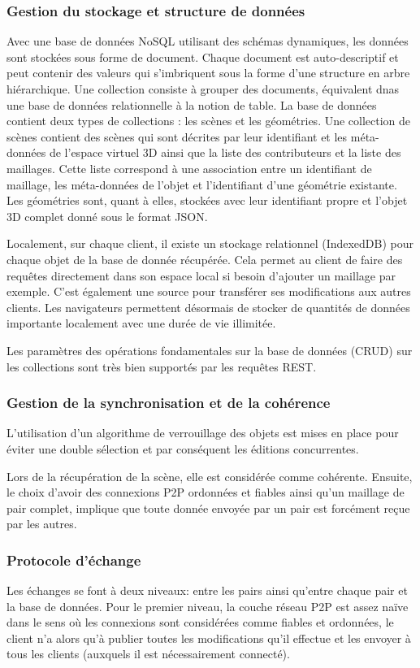 \subsubsection{Gestion du stockage et structure de données}

Avec une base de données NoSQL utilisant des schémas dynamiques, les 
données sont stockées sous forme de document. Chaque document est 
auto-descriptif et peut contenir des valeurs qui s'imbriquent sous la forme d'une 
structure en arbre hiérarchique. Une collection consiste à grouper des documents, 
équivalent dnas une base de données relationnelle à la notion de table. La base de 
données contient deux types de collections : les scènes et les géométries. Une 
collection de scènes contient des scènes qui sont décrites par leur identifiant et 
les méta-données de l'espace virtuel 3D ainsi que la liste des contributeurs et la 
liste des maillages. Cette liste correspond à une association entre un identifiant de 
maillage, les méta-données de l'objet et l'identifiant d'une géométrie existante. 
Les géométries sont, quant à elles, stockées avec leur identifiant propre et l'objet 
3D complet donné sous le format \gls{JSON}.

Localement, sur chaque client, il existe un stockage relationnel (IndexedDB) pour 
chaque objet 
de la base de donnée récupérée. Cela permet au client de faire des requêtes 
directement dans son espace local si besoin d'ajouter un maillage par exemple. 
C'est également une source pour transférer ses modifications aux autres clients.
Les navigateurs permettent désormais de stocker de quantités de données 
importante localement avec une durée de vie illimitée. 

Les paramètres des opérations fondamentales sur la base de données 
(\gls{CRUD}) sur les collections sont très bien supportés par les requêtes 
\gls{REST}.
\subsubsection{Gestion de la synchronisation et de la cohérence}
L'utilisation d'un algorithme de verrouillage des objets est mises en place pour 
éviter une double sélection et par conséquent les éditions concurrentes. 

Lors de la récupération de la scène, elle est considérée comme cohérente. 
Ensuite, le choix d'avoir des connexions \gls{P2P} ordonnées et fiables ainsi qu'un 
maillage de pair complet, implique que toute donnée envoyée par un pair est 
forcément reçue par les autres. 
\subsubsection{Protocole d'échange}
Les échanges se font à deux niveaux: entre les pairs ainsi qu'entre chaque pair et 
la base de données. Pour le premier niveau, la couche réseau \gls{P2P} est assez 
naïve dans le sens où les connexions sont considérées comme fiables et 
ordonnées, le client n'a alors qu'à publier toutes les modifications qu'il effectue et 
les envoyer à tous les clients (auxquels il est nécessairement connecté).

